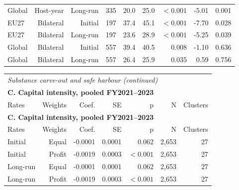 {\begin{longtable}{@{}lrrrrrrrr@{}}
Global & Host-year & Long-run & 335 & 20.0 & 25.0 & $<0.001$ &  -5.01 & 0.001 \\
EU27 & Bilateral & Initial & 197 & 37.4 & 45.1 & $<0.001$ &  -7.70 & 0.028 \\
EU27 & Bilateral & Long-run & 197 & 23.6 & 28.9 & $<0.001$ &  -5.25 & 0.039 \\
Global & Bilateral & Initial & 557 & 39.4 & 40.5 & 0.008 &  -1.10 & 0.636 \\
Global & Bilateral & Long-run & 557 & 26.4 & 25.9 & 0.035 &   0.59 & 0.756 \\
\end{longtable}
\addtocounter{table}{-1}
\begin{longtable}{@{}lrrrrrr@{}}
\multicolumn{7}{l}{\textit{Substance carve-out and safe harbour (continued)}} \\
\multicolumn{7}{l}{\textbf{C. Capital intensity, pooled FY2021–2023}} \\
\toprule
Rates & Weights & Coef. & SE & p & N & Clusters \\
\midrule
\endfirsthead
\multicolumn{7}{l}{\textbf{C. Capital intensity, pooled FY2021–2023}} \\
\toprule
Rates & Weights & Coef. & SE & p & N & Clusters \\
\midrule
\endhead
\midrule
\endfoot
\bottomrule
\endlastfoot
Initial & Equal & -0.0001 & 0.0001 & 0.062 & 2,653 & 27 \\
Initial & Profit & -0.0019 & 0.0003 & $<0.001$ & 2,653 & 27 \\
Long-run & Equal & -0.0001 & 0.0001 & 0.062 & 2,653 & 27 \\
Long-run & Profit & -0.0019 & 0.0003 & $<0.001$ & 2,653 & 27 \\
\end{longtable}
\par{}\par
}
